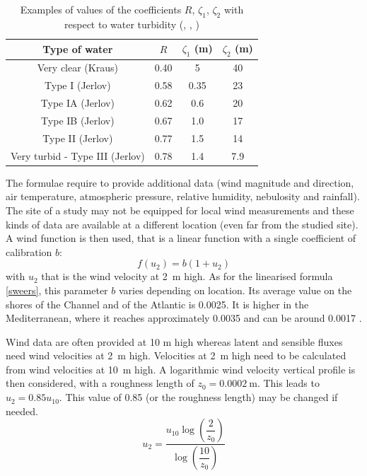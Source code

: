\begin{table}[ptbh]
\caption{Examples of values of the coefficients $R$, $\zeta_{1}$, $\zeta_{2}$
with respect to water turbidity (\cite{paulson}, \cite{jerlov}, \cite{kraus})}%
\label{jerlov}%
\centering
\begin{tabular}
[c]{|c|c|c|c|}\hline
Type of water & $R$ & $\zeta_{1}$ (m) & $\zeta_{2}$ (m)\\\hline
Very clear (Kraus) & 0.40 & 5 & 40\\\hline
Type I (Jerlov) & 0.58 & 0.35 & 23\\\hline
Type IA (Jerlov) & 0.62 & 0.6 & 20\\\hline
Type IB (Jerlov) & 0.67 & 1.0 & 17\\\hline
Type II (Jerlov) & 0.77 & 1.5 & 14\\\hline
Very turbid - Type III (Jerlov) & 0.78 & 1.4 & 7.9\\\hline
\end{tabular}
\end{table}

The formulae require to provide additional data (wind magnitude and direction,
air temperature, atmospheric pressure, relative humidity, nebulosity and rainfall).
The site of a study may not be equipped for local wind measurements and these
kinds of data are available at a different location (even far from the studied
site). A wind function is then used, that is a linear function with a single
coefficient of calibration $b$:
\begin{equation}
f(u_{2}) = b(1+u_{2})
\end{equation}
with $u_{2}$ that is the wind velocity at 2~m high. As for the linearised
formula \eqref{sweers}, this parameter $b$ varies depending on location. Its
average value on the shores of the Channel and of the Atlantic is 0.0025. It
is higher in the Mediterranean, where it reaches approximately 0.0035 and can
be around 0.0017 \cite{salencon}.

Wind data are often provided at 10 m high whereas latent and sensible fluxes
need wind velocities at 2~m high. Velocities at 2~m high need to be calculated
from wind velocities at 10~m high. A logarithmic wind velocity vertical profile is
then considered, with a roughness length of $z_{0} =
0.0002~\mathrm{{m}}$. This leads to $u_{2} = 0.85 u_{10}$. This value
of 0.85 (or the roughness length) may be changed if needed.
\begin{equation}
u_{2} = \dfrac{u_{10}\log\left(\dfrac{2}{z_{0}}\right)}{\log\left(\dfrac{10}{z_{0}}\right)}%
\end{equation}



